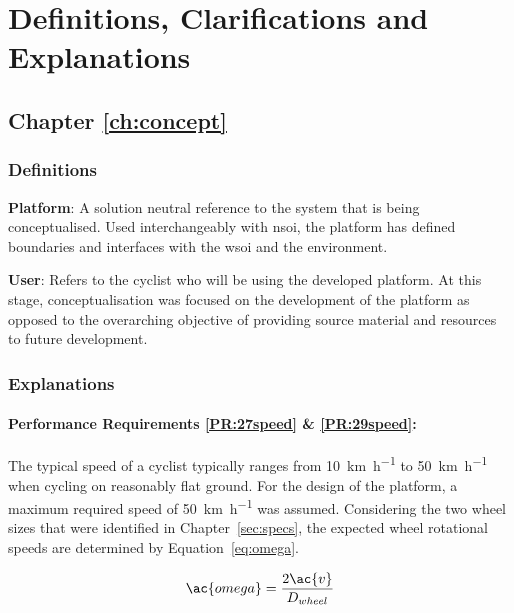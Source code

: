 \newpage

\chapter{Definitions, Clarifications and Explanations}

\label{ch:defs}

\section{Chapter \ref{ch:concept}}

\subsection*{Definitions}

\label{sec:defs3}

\textbf{Platform}: A solution neutral reference to the system that is being conceptualised. Used interchangeably with \acf{nsoi}, the platform has defined boundaries and interfaces with the \acf{wsoi} and the environment.

\textbf{User}: Refers to the cyclist who will be using the developed platform. At this stage, conceptualisation was focused on the development of the platform as opposed to the overarching objective of providing source material and resources to future development.

\subsection*{Explanations}

\subsubsection{Performance Requirements \ref{PR:27speed} \& \ref{PR:29speed}:}

The typical speed of a cyclist typically ranges from \SI{10}{\kilo\meter\per\hour} to \SI{50}{\kilo\meter\per\hour} when cycling on reasonably flat ground. For the design of the platform, a maximum required speed of \SI{50}{\kilo\meter\per\hour} was assumed. Considering the two wheel sizes that were identified in Chapter~\ref{sec:specs}, the expected wheel rotational speeds are determined by Equation~\ref{eq:omega}.

\begin{equation}
	\ac{omega} = \frac{2 \ac{v}}{D_{wheel}}
	\label{eq:omega}
\end{equation}

